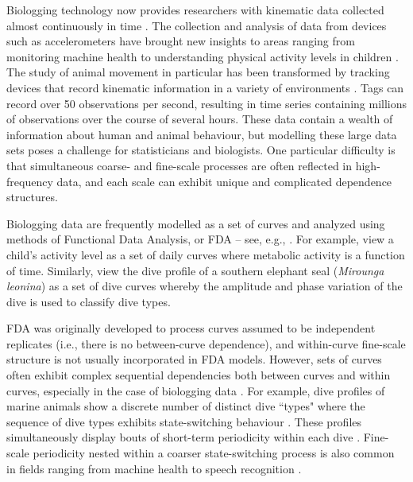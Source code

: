 
Biologging technology now provides researchers with kinematic data collected almost continuously in time \citep{Hooten:2017}.
The collection and analysis of data from devices such as accelerometers have brought new insights to areas ranging from monitoring machine health \citep{Getman:2009} to understanding physical activity levels in children \citep{Morris:2007}. The study of animal movement in particular has been transformed by tracking devices that record kinematic information in a variety of environments \citep{Borger:2020,Dot:2016b}. Tags can record over 50 observations per second, resulting in time series containing millions of observations over the course of several hours. %
These data contain a wealth of information about human and animal behaviour, but modelling these large data sets poses a challenge for statisticians and biologists. One particular difficulty is that simultaneous coarse- and fine-scale processes are often reflected in high-frequency data, and each scale can exhibit unique and complicated dependence structures.

Biologging data are frequently modelled as a set of curves and analyzed using methods of Functional Data Analysis, or FDA -- see, e.g., \citet{Ramsay:2005}. For example, \citet{Morris:2007} view a child's activity level as a set of daily curves where metabolic activity is a function of time. Similarly, \citet{Fu:2017} view the dive profile of a southern elephant seal (\textit{Mirounga leonina}) as a set of dive curves whereby the amplitude and phase variation of the dive is used to classify dive types.

FDA was originally developed to process curves assumed to be independent replicates (i.e., there is no between-curve dependence), and within-curve fine-scale structure is not usually incorporated in FDA models. However, sets of curves often exhibit complex sequential dependencies both between curves and within curves, especially in the case of biologging data \citep{Barajas:2017}.
For example, dive profiles of marine animals show a discrete number of distinct dive ``types"
where the sequence of dive types exhibits state-switching behaviour \citep{Tennessen:2019b}. These profiles simultaneously display bouts of short-term periodicity within each dive \citep{Adam:2019}. Fine-scale periodicity nested within a coarser state-switching process is also common in fields ranging from machine health \citep{Xin:2018,Lucero:2019} to speech recognition \citep{Juang:1991}. 

